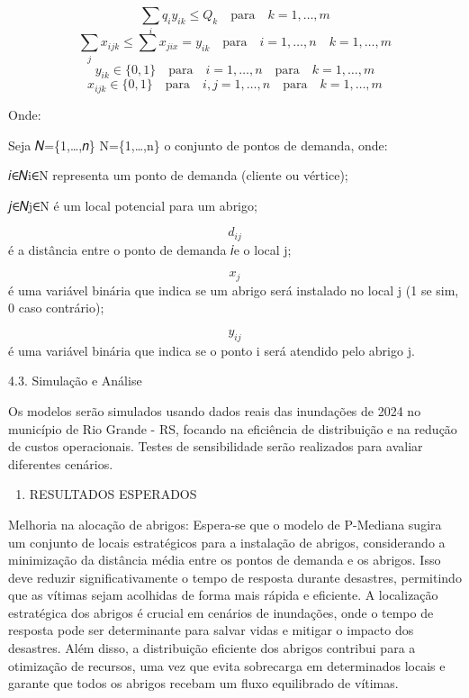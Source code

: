 \documentclass[
]{article}
\providecommand{\tightlist}{%
  \setlength{\itemsep}{0pt}\setlength{\parskip}{0pt}}
\begin{document}
\[\sum_{i}q_{i}y_{ik} \leq Q_{k} \quad \text{para} \quad  k=1, \dots,m\]
\[\sum_{j}x_{ijk} \leq\sum x_{jix}=y_{ik} \quad \text{para}\quad i=1,\dots,n\quad k=1,\dots,m\]
\[y_{ik} \in \{0,1\}\quad\text{para}\quad i=1,\dots,n\quad\text{para}\quad k=1,\dots,m\]
\[x_{ijk} \in \{0,1\}\quad\text{para}\quad i,j=1,\dots,n\quad\text{para}\quad k=1,\dots,m\]

Onde:

Seja 𝑁=\{1,\ldots,𝑛\} N=\{1,\ldots,n\} o conjunto de pontos de demanda,
onde:

𝑖∈𝑁i∈N representa um ponto de demanda (cliente ou vértice);

𝑗∈𝑁j∈N é um local potencial para um abrigo;

\[d_{ij}\] é a distância entre o ponto de demanda 𝑖e o local j;

\[x_{j}\] é uma variável binária que indica se um abrigo será instalado
no local j (1 se sim, 0 caso contrário);

\[y_{ij}\] é uma variável binária que indica se o ponto i será atendido
pelo abrigo j.

4.3. Simulação e Análise

Os modelos serão simulados usando dados reais das inundações de 2024 no
município de Rio Grande - RS, focando na eficiência de distribuição e na
redução de custos operacionais. Testes de sensibilidade serão realizados
para avaliar diferentes cenários.

\begin{enumerate}
\def\labelenumi{\arabic{enumi}.}
\setcounter{enumi}{4}
\tightlist
\item
  RESULTADOS ESPERADOS
\end{enumerate}

Melhoria na alocação de abrigos: Espera-se que o modelo de P-Mediana
sugira um conjunto de locais estratégicos para a instalação de abrigos,
considerando a minimização da distância média entre os pontos de demanda
e os abrigos. Isso deve reduzir significativamente o tempo de resposta
durante desastres, permitindo que as vítimas sejam acolhidas de forma
mais rápida e eficiente. A localização estratégica dos abrigos é crucial
em cenários de inundações, onde o tempo de resposta pode ser
determinante para salvar vidas e mitigar o impacto dos desastres. Além
disso, a distribuição eficiente dos abrigos contribui para a otimização
de recursos, uma vez que evita sobrecarga em determinados locais e
garante que todos os abrigos recebam um fluxo equilibrado de vítimas.
\end{document}
